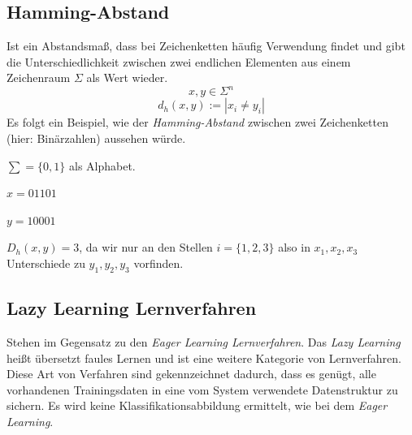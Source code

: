 \documentclass[fontsize=11pt]{scrartcl}
\begin{document}
                         
            \subsection{Hamming-Abstand}
                Ist ein Abstandsmaß, dass bei Zeichenketten häufig Verwendung findet und gibt die Unterschiedlichkeit zwischen zwei endlichen Elementen aus einem Zeichenraum $\Sigma$ als Wert wieder.
                $$ x,y \in \Sigma^n $$
	            $$ d_h(x,y):= |x_i \neq y_i |$$
                Es folgt ein Beispiel, wie der \emph{Hamming-Abstand} zwischen zwei Zeichenketten (hier: Binärzahlen) aussehen würde.\par
                $\sum=\{0,1\}$ als Alphabet.\par
                $x = 01101$\par
                $y= 10001$\par
                $D_h(x,y)=3$, da wir nur an den Stellen $i=\{1,2,3\}$ also in $ x_1,x_2,x_3$ Unterschiede zu $y_1,y_2,y_3$ vorfinden.
                        
            \subsection{Lazy Learning Lernverfahren}  
                Stehen im Gegensatz zu den \emph{Eager Learning Lernverfahren}. Das \emph{Lazy Learning} heißt übersetzt faules Lernen und ist eine weitere Kategorie von Lernverfahren. Diese Art von Verfahren sind gekennzeichnet dadurch, dass es genügt, alle vorhandenen Trainingsdaten in eine vom System verwendete Datenstruktur zu sichern. Es wird keine Klassifikationsabbildung ermittelt, wie bei dem \emph{Eager Learning}. %
                            
                        
\end{document}

